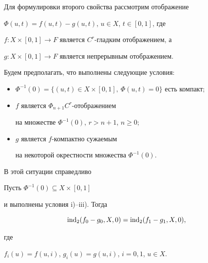 Для формулировки второго свойства рассмотрим отображение


$\Phi (u,t){=}f(u,t){-} g(u,t)$, $u \in X$, $t\in [0,1]$, где


$f: X\times [0,1] \to F$ является $C^r$-гладким отображением, а 


$g: X\times [0,1] \to F$ является непрерывным отображением.


Будем предполагать, что выполнены следующие условия:


\begin{itemize}


\item[i)] $\Phi^{-1}(0) = \{(u,t)\in X\times [0,1],\


\Phi (u,t) = 0 \} $ есть компакт;


\item[ii)] $f$ является $\Phi_{n+1} C^r$-отображением


на множестве $\Phi^{-1}(0)$, $r > n+1$, $n \geq 0$;


\item[iii)] $g$ является $f$-компактно сужаемым 


на некоторой окрестности множества $\Phi^{-1}(0)$.


\end{itemize}





В этой ситуации справедливо





\begin{ptys}


Пусть $\Phi^{-1}(0) \subseteq X\times [0,1]$


и выполнены условия i)--iii). Тогда


\begin{equation}


\Ind_2 (f_0 - g_0, X, 0) = \Ind_2 (f_1 - g_1, X, 0),


\end{equation}


где


$f_i(u) = f(u,i)$, $g_i(u) = g(u,i)$, $i = 0,1$, $u\in X $.


\end{ptys}





